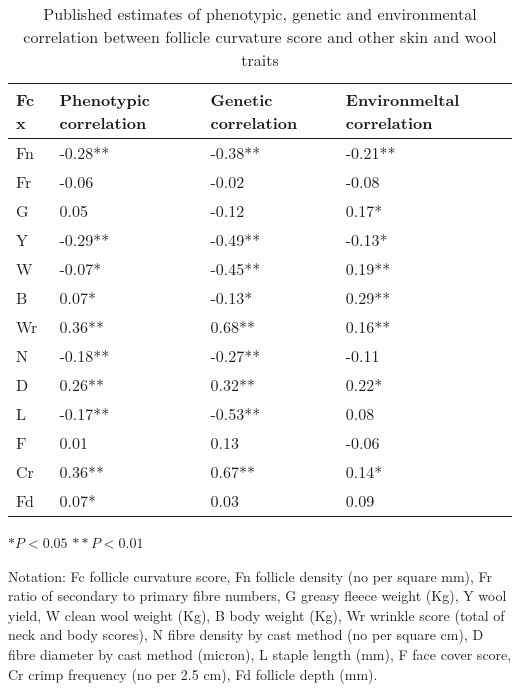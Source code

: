 %

\begin{table}[htp]
\centering
\caption{Published estimates of phenotypic, genetic and environmental correlation between follicle curvature score and other skin and wool traits}
\label{tab:jnt}
\vspace{0.1in}
\begin{tabular}{|p{2.0in}|p{1.0in}|p{1.0in}|p{1.0in}|}  \hline
 Fc x  & Phenotypic correlation  &  Genetic correlation & Environmeltal correlation  \\ 
\hline 
Fn & -0.28** & -0.38**  & -0.21** \\
Fr & -0.06   & -0.02    & -0.08   \\
G  & 0.05    &  -0.12   &  0.17*  \\
Y  & -0.29** &  -0.49** &  -0.13*  \\
W  & -0.07*  &  -0.45** &  0.19**  \\
B  & 0.07*   &  -0.13*  & 0.29**   \\
Wr & 0.36**  &   0.68** &  0.16**  \\
N  & -0.18** &  -0.27** &  -0.11  \\
D  & 0.26**  &   0.32** &  0.22*  \\
L  & -0.17** &  -0.53** &  0.08 \\
F  &  0.01   &   0.13   &  -0.06 \\
Cr &  0.36** &   0.67** &  0.14* \\
Fd &  0.07*  &   0.03   &  0.09  \\
\hline
\end{tabular}
\vspace{0.1in}
\footnotesize

$* P<0.05$    $** P<0.01$

Notation:  Fc follicle curvature score, Fn follicle density (no per square mm), Fr ratio of secondary to primary fibre numbers, G greasy fleece weight (Kg), Y wool yield, W clean wool weight (Kg), B body weight (Kg), Wr wrinkle score (total of neck and body scores), N fibre density by cast method (no per square cm), D fibre diameter by cast method (micron), L staple length (mm), F face cover score, Cr crimp frequency (no per 2.5 cm), Fd follicle depth (mm).
\normalsize 
\end{table}

%

